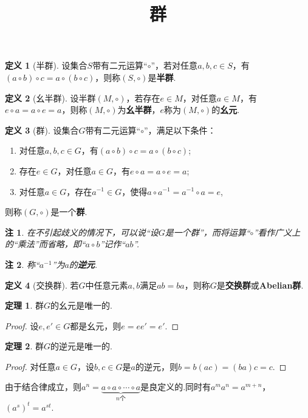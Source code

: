 \documentclass[12pt]{ctexart}
\title{\vspace{-2em}\textbf{群}\vspace{-2em}}
\date{ }
\theoremstyle{definition}
\newtheorem{definition}{定义}
\newtheorem{theorem}{定理}
\theoremstyle{plain}
\newtheorem*{remark}{注}
\begin{document}
	\maketitle
	\begin{definition}[半群]
		设集合$S$带有二元运算“$\circ$”，若对任意$a,b,c\in S$，有$(a\circ b)\circ c=a\circ(b\circ c)$，则称$(S,\circ)$是\textbf{半群}.
	\end{definition}
	\begin{definition}[幺半群]
		设半群$(M,\circ)$，若存在$e\in M$，对任意$a\in M$，有$e\circ a=a\circ e=a$，则称$(M,\circ)$为\textbf{幺半群}，$e$称为$(M,\circ)$的\textbf{幺元}.
	\end{definition}
	\begin{definition}[群]
		设集合$G$带有二元运算“$\circ$”，满足以下条件：
		\begin{enumerate}
			\item 对任意$a,b,c\in G$，有$(a\circ b)\circ c=a\circ (b\circ c)$;
			\item 存在$e\in G$，对任意$a\in G$，有$e\circ a=a\circ e=a$;
			\item 对任意$a\in G$，存在$a^{-1}\in G$，使得$a\circ a^{-1}=a^{-1}\circ a=e$,
		\end{enumerate}
		则称$(G,\circ)$是一个\textbf{群}.
	\end{definition}
	\begin{remark}
		在不引起歧义的情况下，可以说“设$G$是一个群”，而将运算“$\circ$”看作广义上的“乘法”而省略，即“$a\circ b$”记作“$ab$”.
	\end{remark}
	\begin{remark}
		称“$a^{-1}$”为$a$的\textbf{逆元}.
	\end{remark}
	\begin{definition}[交换群]
		若$G$中任意元素$a,b$满足$ab=ba$，则称$G$是\textbf{交换群}或\textbf{Abelian群}.
	\end{definition}
	\begin{theorem}
		群$G$的幺元是唯一的.
	\end{theorem}
	\begin{proof}
		设$e,e'\in G$都是幺元，则$e=ee'=e'$.
	\end{proof}
	\begin{theorem}
		群$G$的逆元是唯一的.
	\end{theorem}
	\begin{proof}
		对任意$a\in G$，设$b,c\in G$是$a$的逆元，则$b=b(ac)=(ba)c=c$.
	\end{proof}
	由于结合律成立，则$a^n=\underbrace{a\circ a\circ\cdots\circ a}_{n\text{个}}$是良定义的.同时有$a^ma^n=a^{m+n}$，$(a^s)^t=a^{st}$.
\end{document}
